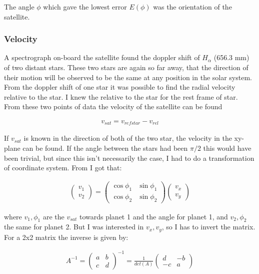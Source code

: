 \documentclass[a4paper, 10pt]{article}
\begin{document}
The angle $\phi$ which gave the lowest error $E(\phi)$ was the orientation of the satellite.

\subsubsection{Velocity}
A spectrograph on-board the satellite found the doppler shift of $H_{\alpha}$ (656.3 mm) of two distant stars. These two stars are again so far away, that the direction of their motion will be observed to be the same at any position in the solar system. From the doppler shift of one star it was possible to find the radial velocity relative to the star. I knew the  relative to the star for the rest frame of star. From these two points of data the velocity of the satellite can be found

\begin{align}
v_{sat} = v_{refstar} - v_{rel}
\end{align}

If $v_{sat}$ is known in the direction of both of the two star,  the velocity in the xy-plane can be found. If the angle between the stars had been $\pi/2$ this would have been trivial, but since this isn't necessarily the case, I had to do a transformation of coordinate system. From \cite{part4} I got that:

\begin{align}
\begin{pmatrix}
v_1\\
v_2
\end{pmatrix}
=
\begin{pmatrix}
\cos \phi_1 & \sin \phi_1 \\
\cos \phi_2 & \sin \phi_2 
\end{pmatrix}
\begin{pmatrix}
v_x\\
v_y
\end{pmatrix}
\end{align}  

where $v_1,\phi_1$ are the $v_{sat}$ towards planet 1 and the angle for planet 1, and $v_2,\phi_2$ the same for planet 2. But I was interested in $v_x,
v_y$, so I has to invert the matrix. For a 2x2 matrix the inverse is given by:

\begin{align}
A^{-1} = 
\begin{pmatrix}
a & b \\
c & d 
\end{pmatrix}^{-1}
=
\frac{1}{det(A)} 
\begin{pmatrix}
d & -b \\
-c & a 
\end{pmatrix}
\end{align}
\end{document}
